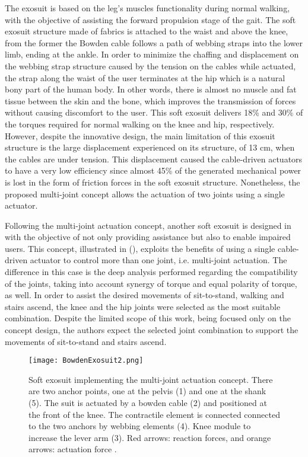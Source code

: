 The exosuit is based on the leg's muscles functionality during normal walking, with the objective of assisting the forward propulsion stage of the gait. The soft exosuit structure made of fabrics is attached to the waist and above the knee, from the former the Bowden cable follows a path of webbing straps into the lower limb, ending at the ankle. In order to minimize the chaffing and displacement on the webbing strap structure caused by the tension on the cables while actuated, the strap along the waist of the user terminates at the hip which is a natural bony part of the human body. In other words, there is almost no muscle and fat tissue between the skin and the bone, which improves the transmission of forces without causing discomfort to the user. This soft exosuit delivers 18\% and 30\% of the torques required for normal walking on the knee and hip, respectively. However, despite the innovative design, the main limitation of this exosuit structure is the large displacement experienced on its structure, of 13 cm, when the cables are under tension. This displacement caused the cable-driven actuators to have a very low efficiency since almost 45\% of the generated mechanical power is lost in the form of friction forces in the soft exosuit structure. Nonetheless, the proposed multi-joint concept allows the actuation of two joints using a single actuator.

Following the multi-joint actuation concept, another soft exosuit is designed in \cite{Bartenbach2015} with the objective of not only providing assistance but also to enable impaired users. This concept, illustrated in (), exploits the benefits of using a single cable-driven actuator to control more than one joint, i.e. multi-joint actuation. The difference in this case is the deep analysis performed regarding the compatibility of the joints, taking into account synergy of torque and equal polarity of torque, as well. In order to assist the desired movements of sit-to-stand, walking and stairs ascend, the knee and the hip joints were selected as the most suitable combination. Despite the limited scope of this work, being focused only on the concept design, the authors expect the selected joint combination to support the movements of sit-to-stand and stairs ascend.

\begin{figure}[hbt!]
    \centering
    \texttt{[image: BowdenExosuit2.png]}
    \caption{Soft exosuit implementing the multi-joint actuation concept. There are two anchor points, one at the pelvis (1) and one at the shank (5). The suit is actuated by a bowden cable (2) and positioned at the front of the knee. The contractile element is connected connected to the two anchors by webbing elements (4). Knee module to increase the lever arm (3). Red arrows: reaction forces, and orange arrows: actuation force \cite{Bartenbach2015}. }
    \label{fig:bowden_exo2}
\end{figure}

